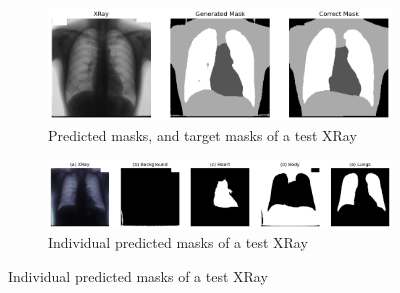  
    \begin{figure}[htbp]
        \centering
        \begin{subfigure}{0.8\linewidth}
            \centering
            \includegraphics[width=\linewidth]{../plots/segmentation2/result1.png}
            \caption{Predicted masks, and target masks of a test XRay}
            \label{fig:organs-segmentation-result1}
        \end{subfigure}
        \begin{subfigure}{\linewidth}
            \centering
            \includegraphics[width=\linewidth]{../plots/segmentation2/result2.png}
            \caption{Individual predicted masks of a test XRay }
            \label{fig:organs-segmentation-result2}
        \end{subfigure}
    \end{figure}